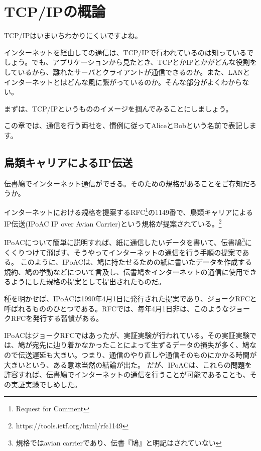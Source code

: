 \chapter{TCP/IPの概論}

TCP/IPはいまいちわかりにくいですよね。

インターネットを経由しての通信は、TCP/IPで行われているのは知っているでしょう。でも、アプリケーションから見たとき、TCPとかIPとかがどんな役割をしているから、離れたサーバとクライアントが通信できるのか。また、LANとインターネットとはどんな風に繋がっているのか。そんな部分がよくわからない。

まずは、TCP/IPというもののイメージを掴んでみることにしましょう。

この章では、通信を行う両社を、慣例に従ってAliceとBobという名前で表記します。

\section{鳥類キャリアによるIP伝送}

伝書鳩でインターネット通信ができる。そのための規格があることをご存知だろうか。

インターネットにおける規格を提案するRFC\footnote{Request for Comment}の1149番で、鳥類キャリアによるIP伝送(IPoAC IP over Avian Carrier)という規格が提案されている。\footnote{https://tools.ietf.org/html/rfc1149}

IPoACについて簡単に説明すれば、紙に通信したいデータを書いて、伝書鳩\footnote{規格ではavian carrierであり、伝書『鳩』と明記はされていない}にくくりつけて飛ばす、そうやってインターネットの通信を行う手順の提案である。
このように、IPoACは、鳩に持たせるための紙に書いたデータを作成する規約、鳩の挙動などについて言及し、伝書鳩をインターネットの通信に使用できるようにした規格の提案として提出されたものだ。

種を明かせば、IPoACは1990年4月1日に発行された提案であり、ジョークRFCと呼ばれるもののひとつである。RFCでは、毎年4月1日非は、このようなジョークRFCを発行する習慣がある。

IPoACはジョークRFCではあったが、実証実験が行われている。その実証実験では、鳩が宛先に辿り着かなかったことによって生ずるデータの損失が多く、鳩なので伝送遅延も大きい。つまり、通信のやり直しや通信そのものにかかる時間が大きいという、ある意味当然の結論が出た。
だが、IPoACは、これらの問題を許容すれば、伝書鳩でインターネットの通信を行うことが可能であることも、その実証実験でしめした。



